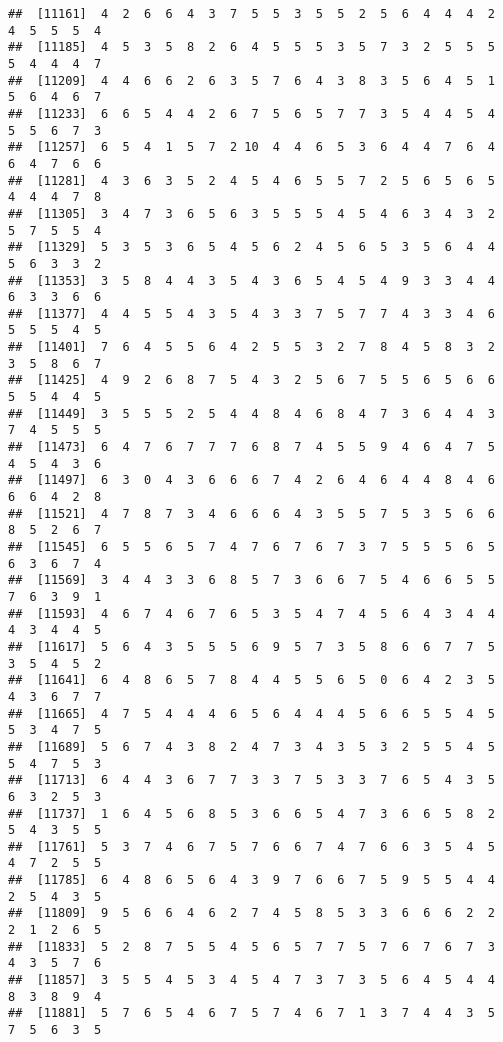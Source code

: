 \documentclass[
]{book}
\begin{document}
\begin{verbatim}
##  [11161]  4  2  6  6  4  3  7  5  5  3  5  5  2  5  6  4  4  4  2  4  5  5  5  4
##  [11185]  4  5  3  5  8  2  6  4  5  5  5  3  5  7  3  2  5  5  5  5  4  4  4  7
##  [11209]  4  4  6  6  2  6  3  5  7  6  4  3  8  3  5  6  4  5  1  5  6  4  6  7
##  [11233]  6  6  5  4  4  2  6  7  5  6  5  7  7  3  5  4  4  5  4  5  5  6  7  3
##  [11257]  6  5  4  1  5  7  2 10  4  4  6  5  3  6  4  4  7  6  4  6  4  7  6  6
##  [11281]  4  3  6  3  5  2  4  5  4  6  5  5  7  2  5  6  5  6  5  4  4  4  7  8
##  [11305]  3  4  7  3  6  5  6  3  5  5  5  4  5  4  6  3  4  3  2  5  7  5  5  4
##  [11329]  5  3  5  3  6  5  4  5  6  2  4  5  6  5  3  5  6  4  4  5  6  3  3  2
##  [11353]  3  5  8  4  4  3  5  4  3  6  5  4  5  4  9  3  3  4  4  6  3  3  6  6
##  [11377]  4  4  5  5  4  3  5  4  3  3  7  5  7  7  4  3  3  4  6  5  5  5  4  5
##  [11401]  7  6  4  5  5  6  4  2  5  5  3  2  7  8  4  5  8  3  2  3  5  8  6  7
##  [11425]  4  9  2  6  8  7  5  4  3  2  5  6  7  5  5  6  5  6  6  5  5  4  4  5
##  [11449]  3  5  5  5  2  5  4  4  8  4  6  8  4  7  3  6  4  4  3  7  4  5  5  5
##  [11473]  6  4  7  6  7  7  7  6  8  7  4  5  5  9  4  6  4  7  5  4  5  4  3  6
##  [11497]  6  3  0  4  3  6  6  6  7  4  2  6  4  6  4  4  8  4  6  6  6  4  2  8
##  [11521]  4  7  8  7  3  4  6  6  6  4  3  5  5  7  5  3  5  6  6  8  5  2  6  7
##  [11545]  6  5  5  6  5  7  4  7  6  7  6  7  3  7  5  5  5  6  5  6  3  6  7  4
##  [11569]  3  4  4  3  3  6  8  5  7  3  6  6  7  5  4  6  6  5  5  7  6  3  9  1
##  [11593]  4  6  7  4  6  7  6  5  3  5  4  7  4  5  6  4  3  4  4  4  3  4  4  5
##  [11617]  5  6  4  3  5  5  5  6  9  5  7  3  5  8  6  6  7  7  5  3  5  4  5  2
##  [11641]  6  4  8  6  5  7  8  4  4  5  5  6  5  0  6  4  2  3  5  4  3  6  7  7
##  [11665]  4  7  5  4  4  4  6  5  6  4  4  4  5  6  6  5  5  4  5  5  3  4  7  5
##  [11689]  5  6  7  4  3  8  2  4  7  3  4  3  5  3  2  5  5  4  5  5  4  7  5  3
##  [11713]  6  4  4  3  6  7  7  3  3  7  5  3  3  7  6  5  4  3  5  6  3  2  5  3
##  [11737]  1  6  4  5  6  8  5  3  6  6  5  4  7  3  6  6  5  8  2  5  4  3  5  5
##  [11761]  5  3  7  4  6  7  5  7  6  6  7  4  7  6  6  3  5  4  5  4  7  2  5  5
##  [11785]  6  4  8  6  5  6  4  3  9  7  6  6  7  5  9  5  5  4  4  2  5  4  3  5
##  [11809]  9  5  6  6  4  6  2  7  4  5  8  5  3  3  6  6  6  2  2  2  1  2  6  5
##  [11833]  5  2  8  7  5  5  4  5  6  5  7  7  5  7  6  7  6  7  3  4  3  5  7  6
##  [11857]  3  5  5  4  5  3  4  5  4  7  3  7  3  5  6  4  5  4  4  8  3  8  9  4
##  [11881]  5  7  6  5  4  6  7  5  7  4  6  7  1  3  7  4  4  3  5  7  5  6  3  5

\end{verbatim}
\end{document}
